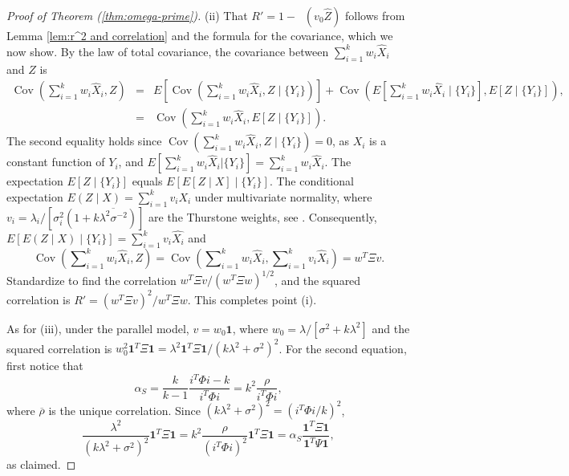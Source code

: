 \documentclass[twoside]{article}
\DeclareMathOperator{\Cov}{Cov}
\DeclareMathOperator{\MSE}{MSE_Z}
\DeclareMathOperator{\tsum}{\textstyle \sum}
\renewcommand{\sqrt}[1]{{(#1)^{1/2}}}
\begin{document}
\begin{proof}[Proof of Theorem (\ref{thm:omega-prime})]
\label{proof:omega-prime}(ii) That $ R'=1-\MSE(v_{0}\hat{Z})$
follows from Lemma \ref{lem:r^2 and correlation} and the formula
for the covariance, which we now show. By the law of total covariance, the covariance between $\tsum_{i=1}^{k}w_{i}\hat{X}_{i}$
and $Z$ is
\begin{eqnarray*}
\Cov(\tsum_{i=1}^{k}w_{i}\hat{X}_{i},Z) & = & E[\Cov(\tsum_{i=1}^{k}w_{i}\hat{X}_{i},Z\mid\{Y_{i}\})]+\Cov(E[\tsum_{i=1}^{k}w_{i}\hat{X}_{i}\mid\{Y_{i}\}],E[Z\mid\{Y_{i}\}]),\\
 & = & \Cov(\tsum_{i=1}^{k}w_{i}\hat{X}_{i},E[Z\mid\{Y_{i}\}]).
\end{eqnarray*}
The second equality holds since $\Cov(\tsum_{i=1}^{k}w_{i}\hat{X}_{i},Z\mid\{Y_{i}\}) = 0$, as $X_i$ is a constant function of $Y_i$, and $E[\tsum_{i=1}^{k}w_{i}\hat{X}_{i}| \{Y_{i}\}] = \tsum_{i=1}^{k}w_{i}\hat{X}_{i}$.
The expectation $E[Z\mid\{Y_{i}\}]$ equals $E[E[Z\mid X]\mid\{Y_{i}\}]$.
The conditional expectation $E(Z\mid X)=\tsum_{i=1}^{k}v_{i}X_{i}$
under multivariate normality, where $v_{i}=\lambda_{i}/[\sigma_{i}^{2}(1+k\overline{\lambda^{2}\sigma^{-2}})]$
are the Thurstone weights, see \citet[Theorem 3.3.4]{Tong1990-lm}.
Consequently, $E[E(Z\mid X)\mid\{Y_{i}\}]=\tsum_{i=1}^{k}v_{i}\hat{X_{i}}$
and 
\begin{equation*}
\Cov(\tsum_{i=1}^{k}w_{i}\hat{X}_{i},Z) =  \Cov(\tsum_{i=1}^{k}w_{i}\hat{X}_{i},\tsum_{i=1}^{k}v_{i}\hat{X}_{i})=w^{T}\Xi v.
\end{equation*}
Standardize to find the correlation $w^{T}\Xi v/\sqrt{w^{T}\Xi w}$,
and the squared correlation is $ R'=(w^{T}\Xi v)^{2}/w^{T}\Xi w$.
This completes point (i). 

As for (iii), under the parallel model, $v=w_{0}\boldsymbol{1}$, where
$w_{0}=\lambda/[\sigma^{2}+k\lambda^{2}]$ and the squared correlation
is $w_{0}^{2}\boldsymbol{1}^{T}\Xi\boldsymbol{1}=\lambda^{2}\boldsymbol{1}^{T}\Xi\boldsymbol{1}/(k\lambda^{2}+\sigma^{2})^{2}$.
For the second equation, first notice that
\[
\alpha_S=\frac{k}{k-1}\frac{i^{T}\Phi i-k}{i^{T}\Phi i}=k^{2}\frac{\rho}{i^{T}\Phi i},
\]
where $\overline{\rho}$ is the unique correlation. Since $(k\lambda^{2}+\sigma^{2})^{2}=(i^{T}\Phi i/k)^{2}$, 
\begin{equation}
\frac{\lambda^{2}}{(k\lambda^{2}+\sigma^{2})^{2}}\boldsymbol{1}^{T}\Xi\boldsymbol{1} =  k^{2}\frac{\rho}{(i^{T}\Phi i)^{2}}\boldsymbol{1}^{T}\Xi\boldsymbol{1} =  \alpha_S\frac{\boldsymbol{1}^{T}\Xi\boldsymbol{1}}{\boldsymbol{1}^{T}\Psi\boldsymbol{1}},\nonumber
\end{equation}
as claimed.


\end{proof}
\end{document}
